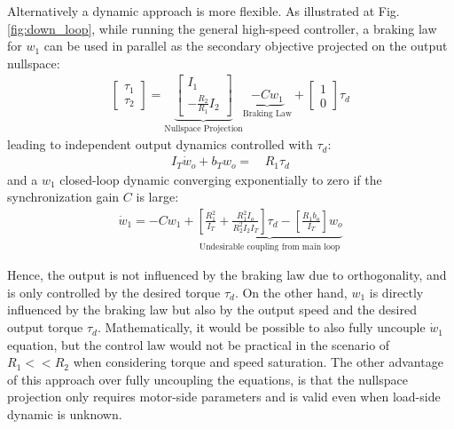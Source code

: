Alternatively a dynamic approach is more flexible. As illustrated at Fig. \ref{fig:down_loop}, while running the general high-speed controller, a braking law for $w_1$ can be used in parallel as the secondary objective projected on the output nullspace:
\begin{align}
\left[ \begin{array}{c}
\tau_1 \\
\tau_2
\end{array} \right]
 = 
\underbrace{\left[ \begin{array}{c}
I_1 \\
-\frac{R_2 }{R_1 }  I_2
\end{array} \right]}_{\text{Nullspace Projection}} \underbrace{-C w_1}_{\text{Braking Law}} + 
\left[ \begin{array}{c}
1 \\
0 
\end{array} \right]  \tau_d
\label{eq:syncrhonization_ctl}
\end{align}
leading to independent output dynamics controlled with $\tau_d$:
\begin{align}
I_T \dot{w}_o +
b_T  w_o
=& \, R_1 \tau_d  
\end{align}
and a $w_1$ closed-loop dynamic converging exponentially to zero if the synchronization gain $C$ is large:
\begin{align}
 \dot{w}_1 = -C w_1 + \underbrace{\left[\frac{R_1^2}{I_T} + \frac{R_1^2 I_o}{R_2^2 I_2 I_T} \right] \tau_d - \left[\frac{R_1 b_o}{I_T}\right] w_o }_{\text{Undesirable coupling from main loop}}
\end{align}

Hence, the output is not influenced by the braking law due to orthogonality, and is only controlled by the desired torque $\tau_d$. On the other hand, $w_1$ is directly influenced by the braking law but also by the output speed and the desired output torque $\tau_d$. Mathematically, it would be possible to also fully uncouple $\dot{w}_1$ equation, but the control law would not be practical in the scenario of $R_1<<R_2$ when considering torque and speed saturation. The other advantage of this approach over fully uncoupling the equations, is that the nullspace projection only requires motor-side parameters and is valid even when load-side dynamic is unknown. 

